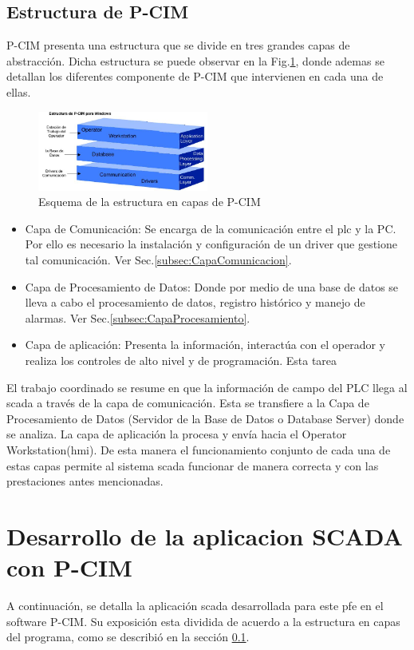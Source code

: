 \subsection{Estructura de P-CIM}
\label{sec:CapasPrograma}
P-CIM presenta una estructura que se divide en tres grandes capas de 
abstracción. Dicha estructura se puede observar en la 
Fig.\ref{fig:estructuraSCADA}, donde ademas se detallan los diferentes 
componente de P-CIM que intervienen en cada una de ellas.
\begin{figure}[ht!]
\centering
	\includegraphics[width=0.5\textwidth]
	{Cap5-SCADA/images/estructura.jpeg}
	\caption{Esquema de la estructura en capas de P-CIM}
	\label{fig:estructuraSCADA}
\end{figure}

\begin{itemize}
 \item Capa de Comunicación: Se encarga de la comunicación entre el \gls{plc} y 
 la PC. Por ello es necesario la instalación y configuración de un driver que 
 gestione tal comunicación. Ver Sec.\ref{subsec:CapaComunicacion}.
 \item Capa de Procesamiento de Datos: Donde por medio de una base de datos se 
lleva a cabo el procesamiento de datos, registro histórico y manejo de alarmas. 
Ver Sec.\ref{subsec:CapaProcesamiento}.
 \item Capa de aplicación: Presenta la información, interactúa con el operador 
  y realiza los controles de alto nivel y de programación. Esta tarea 
\end{itemize}

El trabajo coordinado se resume en que la información de campo del PLC llega al 
\gls{scada} a través de la capa de comunicación. Esta se transfiere a la Capa de 
Procesamiento de Datos (Servidor de la Base de Datos o Database Server) donde se 
analiza. La capa de aplicación la procesa y envía hacia el Operator 
Workstation(\gls{hmi}). De esta manera el funcionamiento conjunto de cada una de 
estas capas permite al sistema \gls{scada} funcionar de manera correcta y con 
las prestaciones antes mencionadas.


\section{Desarrollo de la aplicacion SCADA con P-CIM}
A continuación, se detalla la aplicación \gls{scada} desarrollada para este 
\gls{pfe} en el software P-CIM. Su exposición esta dividida de acuerdo a la 
estructura en capas del programa, como se describió en la sección 
\ref{sec:CapasPrograma}.

